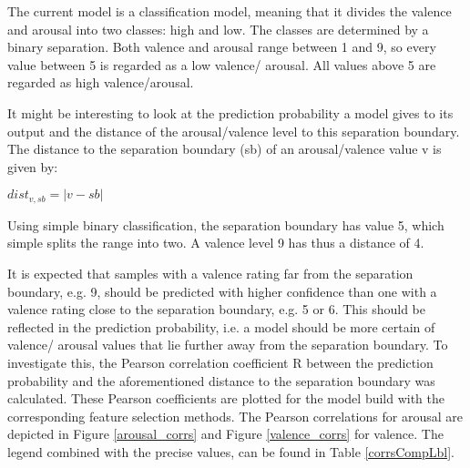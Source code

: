 The current model is a classification model, meaning that it divides the valence and arousal into two classes: high and low. The classes are determined by a binary separation. Both valence and arousal range between 1 and 9, so every value between 5 is regarded as a low valence/ arousal. All values above 5 are regarded as high valence/arousal.

\npar

It might be interesting to look at the prediction probability a model gives to its output and the distance of the arousal/valence level to this separation boundary. The distance to the separation boundary (sb) of an arousal/valence value v is given by:
\begin{center}
$dist_{v, sb} = | v - sb |$
\end{center}
Using simple binary classification, the separation boundary has value 5, which simple splits the range into two. A valence level 9 has thus a distance of 4.

\npar

It is expected that samples with a valence rating far from the separation boundary, e.g. 9, should be predicted with higher confidence than one with a valence rating close to the separation boundary, e.g. 5 or 6. This should be reflected in the prediction probability, i.e. a model should be more certain of valence/ arousal values that lie further away from the separation boundary. To investigate this, the Pearson correlation coefficient R between the prediction probability and the aforementioned distance to the separation boundary was calculated. These Pearson coefficients are plotted for the model build with the corresponding feature selection methods. The Pearson correlations for arousal are depicted in Figure \ref{arousal_corrs} and Figure \ref{valence_corrs} for valence. The legend combined with the precise values, can be found in Table \ref{corrsCompLbl}.


